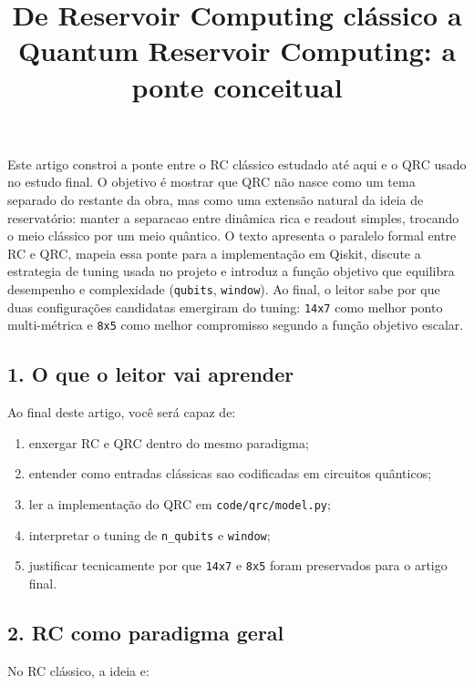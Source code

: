 \documentclass[12pt]{article}
\title{De Reservoir Computing clássico a Quantum Reservoir Computing: a ponte conceitual}
\author{}
\providecommand{\tightlist}{%
  \setlength{\itemsep}{0pt}\setlength{\parskip}{0pt}}
\begin{document}
\maketitle

\begin{resumo}
Este artigo constroi a ponte entre o RC clássico estudado até aqui e o QRC usado no estudo final. O objetivo é mostrar que QRC não nasce como um tema separado do restante da obra, mas como uma extensão natural da ideia de reservatório: manter a separacao entre dinâmica rica e readout simples, trocando o meio clássico por um meio quântico. O texto apresenta o paralelo formal entre RC e QRC, mapeia essa ponte para a implementação em Qiskit, discute a estrategia de tuning usada no projeto e introduz a função objetivo que equilibra desempenho e complexidade (\texttt{qubits}, \texttt{window}). Ao final, o leitor sabe por que duas configurações candidatas emergiram do tuning: \texttt{14x7} como melhor ponto multi-métrica e \texttt{8x5} como melhor compromisso segundo a função objetivo escalar.
\end{resumo}

\subsection{1. O que o leitor vai aprender}\label{1-o-que-o-leitor-vai-aprender}

Ao final deste artigo, você será capaz de:

\begin{enumerate}
\def\labelenumi{\arabic{enumi}.}
\tightlist
\item
  enxergar RC e QRC dentro do mesmo paradigma;
\item
  entender como entradas clássicas sao codificadas em circuitos quânticos;
\item
  ler a implementação do QRC em \texttt{code/qrc/model.py};
\item
  interpretar o tuning de \texttt{n\_qubits} e \texttt{window};
\item
  justificar tecnicamente por que \texttt{14x7} e \texttt{8x5} foram preservados para o artigo final.
\end{enumerate}

\subsection{2. RC como paradigma geral}\label{2-rc-como-paradigma-geral}

No RC clássico, a ideia e:
\end{document}
